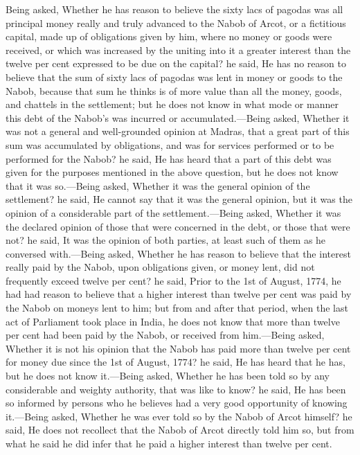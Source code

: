 Being asked, Whether he has reason to believe the sixty lacs of pagodas was all principal money really and truly advanced to the Nabob of Arcot, or a fictitious capital, made up of obligations given by him, where no money or goods were received, or which was increased by the uniting into it a greater interest than the twelve per cent expressed to be due on the capital? he said, He has no reason to believe that the sum of sixty lacs of pagodas was lent in money or goods to the Nabob, because that sum he thinks is of more value than all the money, goods, and chattels in the settlement; but he does not know in what mode or manner this debt of the Nabob's was incurred or accumulated.—Being asked, Whether it was not a general and well-grounded opinion at Madras, that a great part of this sum was accumulated by obligations, and was for services performed or to be performed for the Nabob? he said, He has heard that a part of this debt was given for the purposes mentioned in the above question, but he does not know that it was so.—Being asked, Whether it was the general opinion of the settlement? he said, He cannot say that it was the general opinion, but it was the opinion of a considerable part of the settlement.—Being asked, Whether it was the declared opinion of those that were concerned in the debt, or those that were not? he said, It was the opinion of both parties, at least such of them as he conversed with.—Being asked, Whether he has reason to believe that the interest really paid by the Nabob, upon obligations given, or money lent, did not frequently exceed twelve per cent? he said, Prior to the 1st of August, 1774, he had had reason to believe that a higher interest than twelve per cent was paid by the Nabob on moneys lent to him; but from and after that period, when the last act of Parliament took place in India, he does not know that more than twelve per cent had been paid by the Nabob, or received from him.—Being asked, Whether it is not his opinion that the Nabob has paid more than twelve per cent for money due since the 1st of August, 1774? he said, He has heard that he has, but he does not know it.—Being asked, Whether he has been told so by any considerable and weighty authority, that was like to know? he said, He has been so informed by persons who he believes had a very good opportunity of knowing it.—Being asked, Whether he was ever told so by the Nabob of Arcot himself? he said, He does not recollect that the Nabob of Arcot directly told him so, but from what he said he did infer that he paid a higher interest than twelve per cent.

